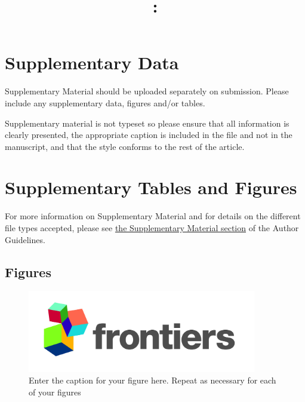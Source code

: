 \documentclass[utf8]{frontiers_suppmat} %
\begin{document}
\onecolumn
{}

\title[Supplementary Material]{{}:
\\ } %


\maketitle


\section{Supplementary Data}

Supplementary Material should be uploaded separately on submission. Please include any supplementary data, figures and/or tables. 

Supplementary material is not typeset so please ensure that all information is clearly presented, the appropriate caption is included in the file and not in the manuscript, and that the style conforms to the rest of the article. 

\section{Supplementary Tables and Figures}

For more information on Supplementary Material and for details on the different file types accepted, please see  \href{http://home.frontiersin.org/about/author-guidelines#SupplementaryMaterial}{the Supplementary Material section}  of the Author Guidelines.


\subsection{Figures}


\begin{figure}[h!]
\begin{center}
\includegraphics[width=10cm]{logo1}%
\end{center}
\caption{ Enter the caption for your figure here.  Repeat as  necessary for each of your figures}\label{fig:1}
\end{figure}
\end{document}
